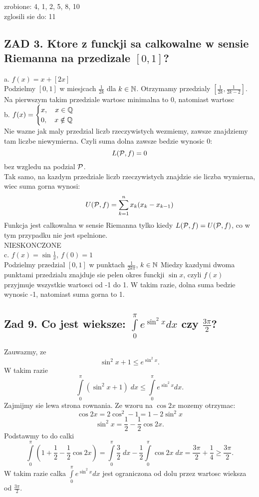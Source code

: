 \documentclass{article}
\begin{document}
\ttfamily
    zrobione: 4, 1, 2, 5, 8, 10\\
    zglosili sie do: 11
\subsection*{ZAD 3. Ktore z funckji sa calkowalne w sensie Riemanna na przedizale $[0,1]$?}
\indent a. $f(x)=x+[2x]$\medskip\\
    Podzielmy $[0,1]$ w miesjcach $\frac1{2k}$ dla $k\in\mathbb{N}$. Otrzymamy przedzialy $[\frac1{2k}, \frac1{2k-2}]$. Na pierwszym takim przedziale wartosc minimalna to 0, natomiast wartosc\bigskip\\
\indent b. $f(x)=\begin{cases}x,\quad x\in\mathbb{Q}\\0,\quad x\notin\mathbb{Q}\end{cases}$\medskip\\
    Nie wazne jak maly przedzial liczb rzeczywistych wezmiemy, zawsze znajdziemy tam liczbe niewymierna. Czyli suma dolna zawsze bedzie wynosic 0:
    $$L(\mathcal{P},f)=0$$
    bez wzgledu na podzial $\mathcal{P}$. \smallskip\\
    Tak samo, na kazdym przedziale liczb rzeczywistych znajdzie sie liczba wymierna, wiec suma gorna wynosi:
    $$U(\mathcal{P}, f)=\sum\limits_{k=1}^nx_k(x_k-x_{k-1})$$
    Funkcja jest calkowalna w sensie Riemanna tylko kiedy $L(\mathcal{P},f)=U(\mathcal{P},f)$, co w tym przypadku nie jest spelnione.\\\color{emp}NIESKONCZONE\color{txt}\bigskip\\
\indent c. $f(x)=\sin\frac1x$, $f(0)=1$\medskip\\
    Podzielmy przedzial $[0,1]$ w punktach $\frac1{2k\pi}$, $k\in\mathbb{N}$ Miedzy kazdymi dwoma punktami przedzialu znajduje sie pelen okres funckji $\sin x$, czyli $f(x)$ przyjmuje wszystkie wartosci od -1 do 1. W takim razie, dolna suma bedzie wynosic -1, natomiast suma gorna to 1.\bigskip\\
\subsection*{Zad 9. Co jest wieksze: $\int\limits_0^\pi e^{\sin^{2}x}dx$ czy $\frac{3\pi}{2}$?}
    Zauwazmy, ze
    $$\sin^2x+1\leq e^{\sin^2x}.$$
    W takim razie
    $$\int\limits_0^\pi (\sin^2x+1)\;dx\leq \int\limits_0^\pi e^{\sin^2x}dx.$$
    Zajmijmy sie lewa strona rownania. Ze wzoru na $\cos 2x$ mozemy otrzymac:
    $$\cos 2x = 2\cos^2-1=1-2\sin^2x$$
    $$\sin^2x=\frac12-\frac12\cos 2x.$$
    Podstawmy to do calki
    $$\int\limits_0^\pi(1+\frac12-\frac12\cos 2x)=\int\limits_0^\pi \frac32\;dx-\frac12\int\limits_0^\pi\cos 2x\;dx=\frac{3\pi}2+\frac14\geq\frac{3\pi}2.$$
    W takim razie calka $\int\limits_0^\pi e^{\sin^2x}dx$ jest ograniczona od dolu przez wartosc wieksza od $\frac{3\pi}2$.
\end{document}
